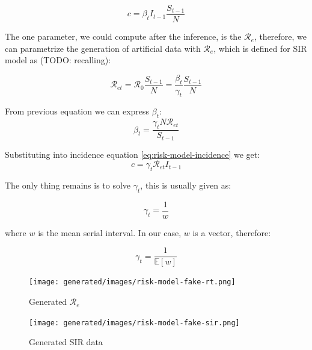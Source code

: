 \documentclass[
  digital, %
  oneside, %
  lof,     %
  lot,     %
]{fithesis4}
\begin{document}
\begin{equation}
  \label{eq:risk-model-incidence}
  c = \beta_t I_{t-1} \frac{S_{t-1}}{N}
\end{equation}

The one parameter, we could compute after the inference, 
is the $\mathcal{R}_e$, therefore, we can parametrize 
the generation of artificial data with $\mathcal{R}_e$, which
is defined for SIR model as (TODO: recalling):

\begin{equation}\label{eq:risk-model-rt}
\mathcal{R}_{et} = \mathcal{R}_0 \frac{S_{t-1}}{N} = \frac{\beta_t}{\gamma_t} \frac{S_{t-1}}{N}
\end{equation}

From previous equation we can express $\beta_t$:
\begin{equation}
\beta_t = \frac{\gamma_t N \mathcal{R}_{et}}{S_{t-1}}
\end{equation}

Substituting into incidence equation \eqref{eq:risk-model-incidence} we get:
\begin{equation}
  c = \gamma_t \mathcal{R}_{et} I_{t-1}
\end{equation}

The only thing remains is to solve $\gamma_t$, this is usually given as:

\begin{equation}
  \gamma_t = \frac{1}{w}
\end{equation}

where $w$ is the mean serial interval. In our case, $w$ is a vector, therefore:

\begin{equation}
  \gamma_t = \frac{1}{\mathbb{E}[w]}
\end{equation}

\begin{figure}[h]
  \begin{center}
    \texttt{[image: generated/images/risk-model-fake-rt.png]}
  \end{center}
  \caption{Generated $\mathcal{R}_{e}$}
  \label{fig:risk-model-fake-rt}
\end{figure}

\begin{figure}[h]
  \begin{center}
    \texttt{[image: generated/images/risk-model-fake-sir.png]}
  \end{center}
  \caption{Generated SIR data}
  \label{fig:risk-model-fake-sir}
\end{figure}
\end{document}
